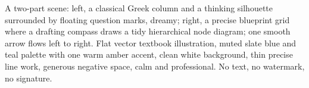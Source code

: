 A two-part scene: left, a classical Greek column and a thinking silhouette surrounded by floating question marks, dreamy; right, a precise blueprint grid where a drafting compass draws a tidy hierarchical node diagram; one smooth arrow flows left to right. Flat vector textbook illustration, muted slate blue and teal palette with one warm amber accent, clean white background, thin precise line work, generous negative space, calm and professional. No text, no watermark, no signature.
